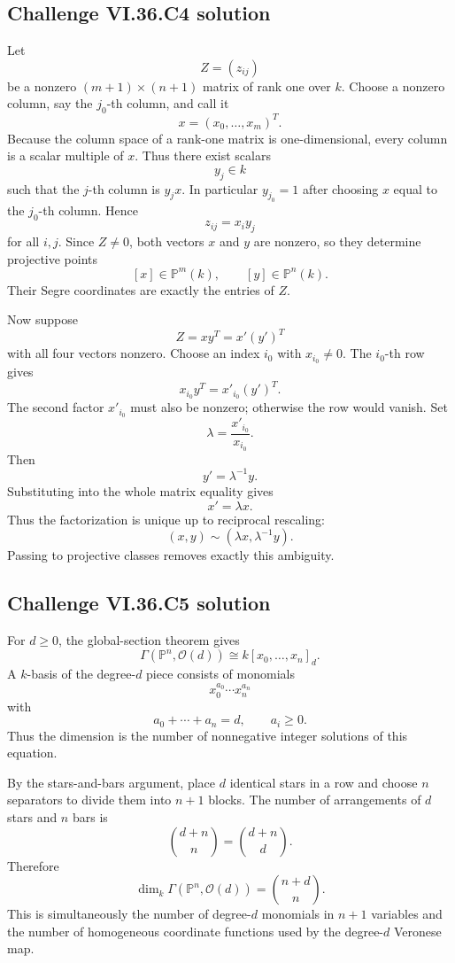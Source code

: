 \subsection*{Challenge VI.36.C4 solution}
\begin{solution}
Let
\[
Z=(z_{ij})
\]
be a nonzero \((m+1)\times(n+1)\) matrix of rank one over \(k\). Choose a nonzero column, say the \(j_0\)-th
column, and call it
\[
x=(x_0,\ldots,x_m)^T.
\]
Because the column space of a rank-one matrix is one-dimensional, every column is a scalar multiple of \(x\).
Thus there exist scalars
\[
y_j\in k
\]
such that the \(j\)-th column is \(y_jx\). In particular \(y_{j_0}=1\) after choosing \(x\) equal to the
\(j_0\)-th column. Hence
\[
z_{ij}=x_i y_j
\]
for all \(i,j\). Since \(Z\neq0\), both vectors \(x\) and \(y\) are nonzero, so they determine projective points
\[
[x]\in\mathbb P^m(k),
\qquad
[y]\in\mathbb P^n(k).
\]
Their Segre coordinates are exactly the entries of \(Z\).

Now suppose
\[
Z=xy^T=x'(y')^T
\]
with all four vectors nonzero. Choose an index \(i_0\) with \(x_{i_0}\neq0\). The \(i_0\)-th row gives
\[
x_{i_0}y^T=x'_{i_0}(y')^T.
\]
The second factor \(x'_{i_0}\) must also be nonzero; otherwise the row would vanish. Set
\[
\lambda=\frac{x'_{i_0}}{x_{i_0}}.
\]
Then
\[
y'=\lambda^{-1}y.
\]
Substituting into the whole matrix equality gives
\[
x'=\lambda x.
\]
Thus the factorization is unique up to reciprocal rescaling:
\[
\boxed{
(x,y)\sim(\lambda x,\lambda^{-1}y).
}
\]
Passing to projective classes removes exactly this ambiguity.
\end{solution}

\subsection*{Challenge VI.36.C5 solution}
\begin{solution}
For \(d\ge0\), the global-section theorem gives
\[
\Gamma(\mathbb P^n,\mathcal O(d))
\cong
k[x_0,\ldots,x_n]_d.
\]
A \(k\)-basis of the degree-\(d\) piece consists of monomials
\[
x_0^{a_0}\cdots x_n^{a_n}
\]
with
\[
a_0+\cdots+a_n=d,
\qquad
a_i\ge0.
\]
Thus the dimension is the number of nonnegative integer solutions of this equation.

By the stars-and-bars argument, place \(d\) identical stars in a row and choose \(n\) separators to divide them
into \(n+1\) blocks. The number of arrangements of \(d\) stars and \(n\) bars is
\[
\binom{d+n}{n}
=
\binom{d+n}{d}.
\]
Therefore
\[
\boxed{
\dim_k\Gamma(\mathbb P^n,\mathcal O(d))
=
\binom{n+d}{n}.
}
\]
This is simultaneously the number of degree-\(d\) monomials in \(n+1\) variables and the number of homogeneous
coordinate functions used by the degree-\(d\) Veronese map.
\end{solution}
